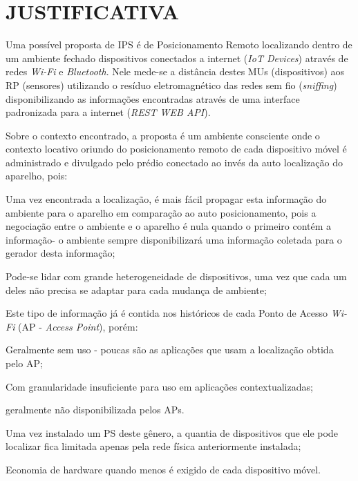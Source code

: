 \chapter{JUSTIFICATIVA}
\label{chap:JUSTIFICATIVA}

Uma possível proposta de IPS é de Posicionamento Remoto localizando dentro de um
ambiente fechado dispositivos conectados a internet (\textit{IoT Devices})
através de redes \textit{Wi-Fi} e \textit{Bluetooth}. Nele mede-se a distância
destes MUs (dispositivos) aos RP (sensores) utilizando o resíduo eletromagnético
das redes sem fio (\textit{sniffing}) disponibilizando as informações
encontradas através de uma interface padronizada para a internet (\textit{REST
WEB API}).

Sobre o contexto encontrado, a proposta é um ambiente consciente onde o contexto
locativo oriundo do posicionamento remoto de cada dispositivo móvel é
administrado e divulgado pelo prédio conectado ao invés da auto localização do
aparelho, pois:

\begin{alineas}

	\item Uma vez encontrada a localização, é mais fácil propagar esta informação do
ambiente para o aparelho em comparação ao auto posicionamento, pois a negociação
entre o ambiente e o aparelho é nula quando o primeiro contém a informação- o
ambiente sempre disponibilizará uma informação coletada para o gerador desta
informação;

	\item Pode-se lidar com grande heterogeneidade de dispositivos, uma vez
que cada um deles não precisa se adaptar para cada mudança de ambiente;

	\item Este tipo de informação já é contida nos históricos de cada Ponto de
	Acesso \textit{Wi-Fi} (AP - \textit{Access Point}), porém:

	\begin{alineas}

		\item Geralmente sem uso - poucas são as aplicações que usam a
		localização obtida pelo AP;

		\item Com granularidade insuficiente para uso em aplicações
		contextualizadas;

		\item geralmente não disponibilizada pelos APs.

	\end{alineas}

	\item Uma vez instalado um PS deste gênero, a quantia de dispositivos que
	ele pode localizar fica limitada apenas pela rede física anteriormente
	instalada;

	\item Economia de hardware quando menos é exigido de cada dispositivo móvel.

\end{alineas}

